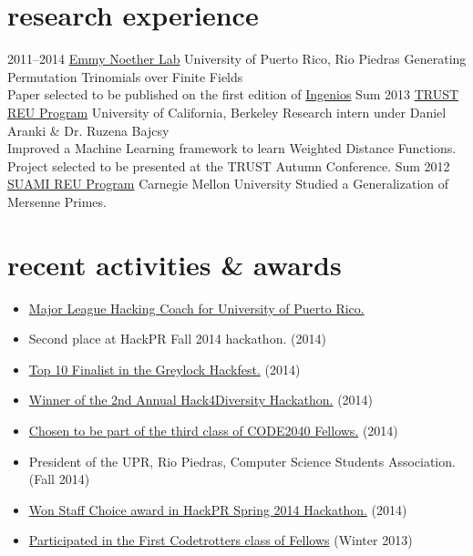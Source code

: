 \documentclass[]{friggeri-cv}
\begin{document}
\section{research experience}

\begin{entrylist}
\entry
{2011--2014}
{\href{http://ccom.uprrp.edu/~labemmy/?page_id=868}{Emmy Noether Lab}}
{University of Puerto Rico, Rio Piedras}
{Generating Permutation Trinomials over Finite Fields \\
Paper selected to be published on the first edition of \href{http://www.ingeniosupr.com/}{Ingenios}}
\entry
{Sum 2013}
{\href{https://www.truststc.org/education/reu/13/index.html}{TRUST REU Program}}
{University of California, Berkeley}
{Research intern under Daniel Aranki \& Dr. Ruzena Bajcsy \\
Improved a Machine Learning framework to learn Weighted Distance Functions. \\
Project selected to be presented at the TRUST Autumn Conference.}
\entry
{Sum 2012}
{\href{http://www.math.cmu.edu/cna/summer_institute.html}{SUAMI REU Program}}
{Carnegie Mellon University}
{Studied a Generalization of Mersenne Primes.}
\end{entrylist}


\section{recent activities \& awards}
\begin{itemize}
\item \href{http://mlh.io}{Major League Hacking Coach for University of Puerto Rico.}
\item Second place at HackPR Fall 2014 hackathon. (2014)
\item \href{http://greylocku.com/hackfest/}{Top 10 Finalist in the Greylock Hackfest.} (2014)
\item \href{https://www.eventbrite.com/e/2nd-annual-hack4diversity-closing-the-gap-tickets-11888106647}{Winner of the 2nd Annual Hack4Diversity Hackathon.} (2014)
\item \href{http://code2040.org}{Chosen to be part of the third class of CODE2040 Fellows.} (2014)
\item President of the UPR, Rio Piedras, Computer Science Students Association. (Fall 2014)
\item \href{https://github.com/chrisrodz/gh-backups}{Won Staff Choice award in HackPR Spring 2014 Hackathon.} (2014)
\item \href{http://codetrotters.com}{Participated in the First Codetrotters class of Fellows} (Winter 2013)
\end{itemize}
\end{document}

